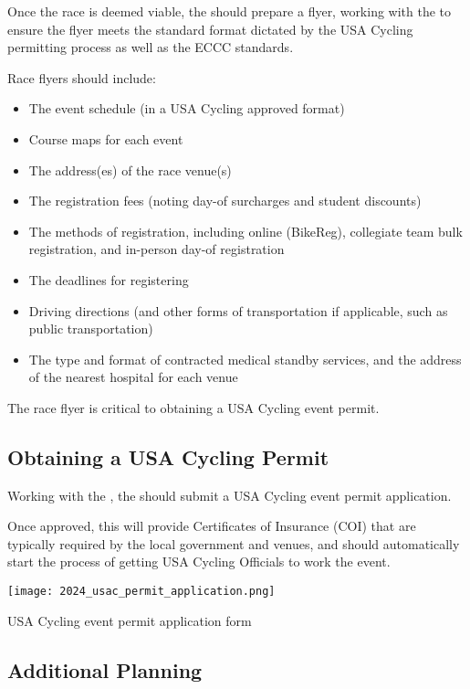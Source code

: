 Once the race is deemed viable, the  should prepare a flyer, working with the 
to ensure the flyer meets the standard format dictated by the USA Cycling permitting process as well as the ECCC standards.

Race flyers should include:
\begin{itemize}
  \item The event schedule (in a USA Cycling approved format)
  \item Course maps for each event
  \item The address(es) of the race venue(s)
  \item The registration fees (noting day-of surcharges and student discounts)
  \item The methods of registration, including online (BikeReg), collegiate team bulk registration, and in-person day-of registration
  \item The deadlines for registering
  \item Driving directions (and other forms of transportation if applicable, such as public transportation)
  \item The type and format of contracted medical standby services, and the address of the nearest hospital for each venue
\end{itemize}

The race flyer is critical to obtaining a USA Cycling event permit.

\subsection[USA Cycling Permitting]{Obtaining a USA Cycling Permit}

Working with the , the  should submit a USA Cycling event permit application.

Once approved, this will provide Certificates of Insurance (COI) %
that are typically required by the local government and venues,
and should automatically start the process of getting USA Cycling Officials to work the event.

\begin{marginfigure}
  \texttt{[image: 2024\_usac\_permit\_application.png]}
  \caption{USA Cycling event permit application form}
\end{marginfigure}

\subsection{Additional Planning}

